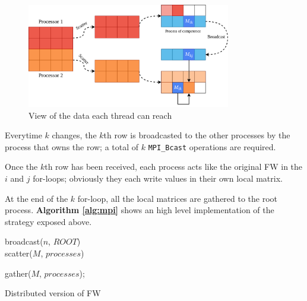 \begin{figure}[h!]
\centering                                                                        
\includegraphics[width=3.5in]{diagrams/mpi-scatter}
\captionsetup{justification=centering}                                                                                                                                   
\caption{View of the data each thread can reach}                                                                                                                                            
\label{fig:threads}                                                                                                                                                           
\end{figure}
Everytime $k$ changes, the $k$th row is broadcasted to the other processes by the process that owns the row;
a total of $k$ \texttt{MPI\_Bcast} operations are required. \par
Once the $k$th row has been received, each process acts like the original FW in the $i$ and $j$ for-loops; obviously
they each write values in their own local matrix. \par

At the end of the $k$ for-loop, all the local matrices are gathered to the root process. 
\textbf{Algorithm \ref*{alg:mpi}} shows an high level implementation of the strategy exposed above.\par

\begin{algorithm}[h!]

\SetAlgoLined

broadcast($n$, $ROOT$) \\
scatter($M$, $processes$)

gather($M$, $processes$);
 
\caption{Distributed version of FW}\label{alg:mpi}
\end{algorithm}


